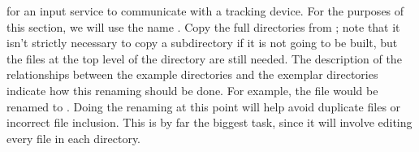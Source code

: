  for an input service to communicate with a tracking device.
For the purposes of this section, we will use the name .
\tertiaryEnd{}
Copy the full directories from ; note that it isn't strictly necessary
to copy a subdirectory if it is not going to be built, but the files at the top level of
the directory are still needed.
\tertiaryEnd{}
The description of the relationships between the example directories and the exemplar
directories indicate how this renaming should be done.
For example, the file  would be renamed to
.
Doing the renaming at this point will help avoid duplicate files or incorrect file
inclusion.
\tertiaryEnd{}
This is by far the biggest task, since it will involve editing every file in each
directory.

